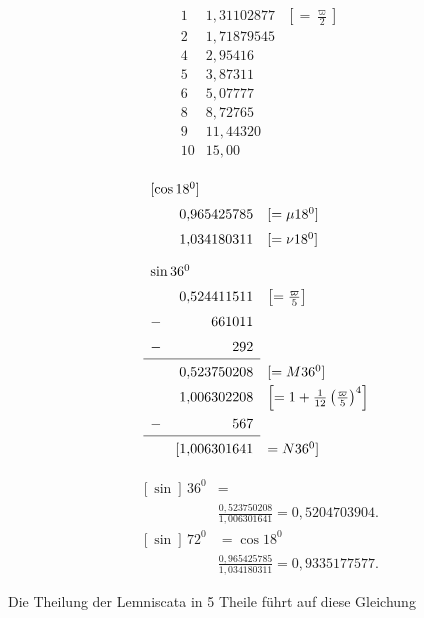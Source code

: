 \clearpage
{}\fancyhead{}
\noindent{\small [S. 90--91]}
\par\medskip
\begingroup\small\setlength{\arraycolsep}{3pt}
\noindent\begin{minipage}[b]{.38\linewidth}
\[\renewcommand{\arraystretch}{1.8}\begin{array}{rrl}
1&1{,}31102877&\left[=\frac{\varpi}{2}\right]\\
2&1{,}71879545&\\4&2{,}95416&\\5&3{,}87311&\\6&5{,}07777&\\8&8{,}72765&\\9&11{,}44320&\\10&15{,}00&
\end{array}\]
\end{minipage}\hfill\begin{minipage}[b]{.58\linewidth}
\[\renewcommand{\arraystretch}{1.5}\begin{array}{rrl}
\multicolumn{3}{l}{[\cos18^0]}\\
&0{,}965425785&[=\mu18^0]\\
&1{,}034180311&[=\nu18^0]\\[5pt]
\multicolumn{3}{l}{\sin36^0}\\
&0{,}524411511&\left[=\frac{\varpi}{5}\right]\\
-&661011&\\-&292&\\\cline{1-2}
&0{,}523750208&[=M36^0]\\
&1{,}006302208&\left[=1+\frac1{12}\left(\frac{\varpi}{5}\right)^4\right]\\
-&567&\\\cline{1-2}
&[1{,}006301641&=N36^0]
\end{array}\]
\end{minipage}
\endgroup
\[\begin{aligned}
[\sin]\,36^0&=\\[-2pt]
&\frac{0{,}523750208}{1{,}006301641}=0{,}5204703904.\\[12pt]
[\sin]\,72^0&=\cos18^0\\[-2pt]
&\frac{0{,}965425785}{1{,}034180311}=0{,}9335177577.
\end{aligned}\]
\noindent{\small [S. 102]}
\par\indent Die Theilung der Lemniscata in 5 Theile führt auf diese Gleichung
